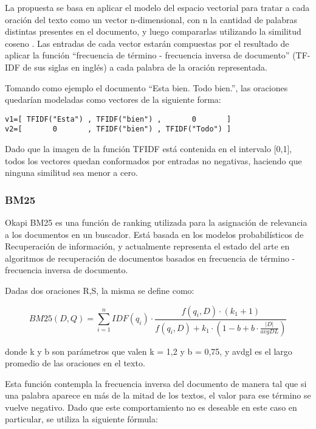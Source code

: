 \documentclass{llncs}
\begin{document}
La propuesta se basa en aplicar el modelo del espacio vectorial para tratar a cada oración del texto como un vector n-dimensional, con n la cantidad de palabras distintas presentes en el documento, y luego compararlas utilizando la similitud coseno . Las entradas de cada vector estarán compuestas por el resultado de aplicar la función “frecuencia de término - frecuencia inversa de documento” (TF-IDF de sus siglas en inglés) a cada palabra de la oración representada.

Tomando como ejemplo el documento “Esta bien. Todo bien.”, las oraciones quedarían modeladas como vectores de la siguiente forma:

\begin{Verbatim}[xleftmargin=3em]
v1=[ TFIDF("Esta") , TFIDF("bien") ,       0       ]
v2=[       0       , TFIDF("bien") , TFIDF("Todo") ]
\end{Verbatim}

Dado que la imagen de la función TFIDF está contenida en el intervalo [0,1], todos los vectores quedan conformados por entradas no negativas, haciendo que ninguna similitud sea menor a cero. 


\subsubsection{BM25}
Okapi BM25 es una función de ranking utilizada para la asignación de relevancia a los documentos en un buscador. Está basada en los modelos probabilísticos de Recuperación de información, y actualmente representa el estado del arte en algoritmos de recuperación de documentos basados en frecuencia de término - frecuencia inversa de documento.

Dadas dos oraciones R,S, la misma se define como:

\begin{equation}
BM25(D,Q) = \sum_{i=1}^{n} IDF(q_i) \cdot \frac{f(q_i, D) \cdot (k_1 + 1)}{f(q_i, D) + k_1 \cdot (1 - b + b \cdot \frac{|D|}{avgDL})}
\end{equation}

donde k y b son parámetros que valen k = 1,2 y b = 0,75, y avdgl es el largo promedio de las oraciones en el texto.

Esta función contempla la frecuencia inversa del documento de manera tal que si una palabra aparece en más de la mitad de los textos, el valor para ese término se vuelve negativo. Dado que este comportamiento no es deseable en este caso en particular, se utiliza la siguiente fórmula:
                
\end{document}
